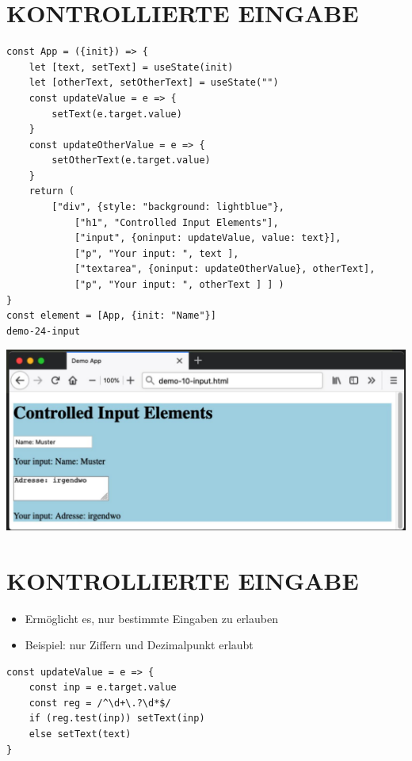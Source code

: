 \documentclass[10pt]{article}
\begin{document}
\section*{KONTROLLIERTE EINGABE}
\begin{verbatim}
const App = ({init}) => {
    let [text, setText] = useState(init)
    let [otherText, setOtherText] = useState("")
    const updateValue = e => {
        setText(e.target.value)
    }
    const updateOtherValue = e => {
        setOtherText(e.target.value)
    }
    return (
        ["div", {style: "background: lightblue"},
            ["h1", "Controlled Input Elements"],
            ["input", {oninput: updateValue, value: text}],
            ["p", "Your input: ", text ],
            ["textarea", {oninput: updateOtherValue}, otherText],
            ["p", "Your input: ", otherText ] ] )
}
const element = [App, {init: "Name"}]
demo-24-input
\end{verbatim}

\begin{center}
\includegraphics[max width=\textwidth]{2025_01_02_a730400f36f38fd94791g-17}
\end{center}

\section*{KONTROLLIERTE EINGABE}
\begin{itemize}
  \item Ermöglicht es, nur bestimmte Eingaben zu erlauben
  \item Beispiel: nur Ziffern und Dezimalpunkt erlaubt
\end{itemize}

\begin{verbatim}
const updateValue = e => {
    const inp = e.target.value
    const reg = /^\d+\.?\d*$/
    if (reg.test(inp)) setText(inp)
    else setText(text)
}
\end{verbatim}
\end{document}
